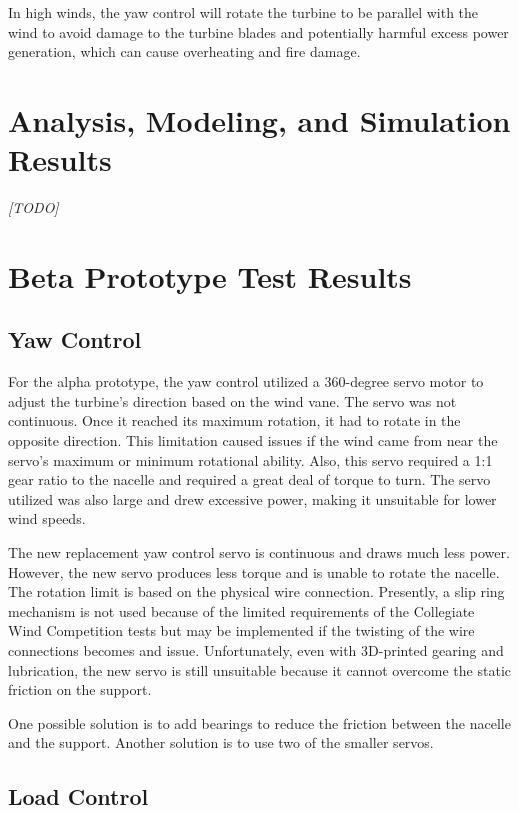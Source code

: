 \documentclass[11pt,letterpaper,conference]{IEEEtran}
\begin{document}
In high winds, the yaw control will rotate the turbine to be parallel with the
wind to avoid damage to the turbine blades and potentially harmful excess power
generation, which can cause overheating and fire damage.

\section{Analysis, Modeling, and Simulation Results}

\emph{[TODO]}

\section{Beta Prototype Test Results}
\subsection{Yaw Control}
\label{sec:yaw_control}

For the alpha prototype, the yaw control utilized a 360-degree servo motor to
adjust the turbine's direction based on the wind vane. The servo was not
continuous. Once it reached its maximum rotation, it had to rotate in the
opposite direction. This limitation caused issues if the wind came from near the
servo's maximum or minimum rotational ability. Also, this servo required a 1:1
gear ratio to the nacelle and required a great deal of torque to turn. The
servo utilized was also large and drew excessive power, making it unsuitable
for lower wind speeds.

The new replacement yaw control servo is continuous and draws much less power.
However, the new servo produces less torque and is unable to rotate the
nacelle. The rotation limit is based on the physical wire connection.
Presently, a slip ring mechanism is not used because of the limited requirements
of the Collegiate Wind Competition tests but may be implemented if the twisting
of the wire connections becomes and issue. Unfortunately, even with 3D-printed
gearing and lubrication, the new servo is still unsuitable because it cannot
overcome the static friction on the support.

One possible solution is to add bearings to reduce the friction between the
nacelle and the support. Another solution is to use two of the smaller servos.


\subsection{Load Control}
\label{sec:load_control}
\end{document}
